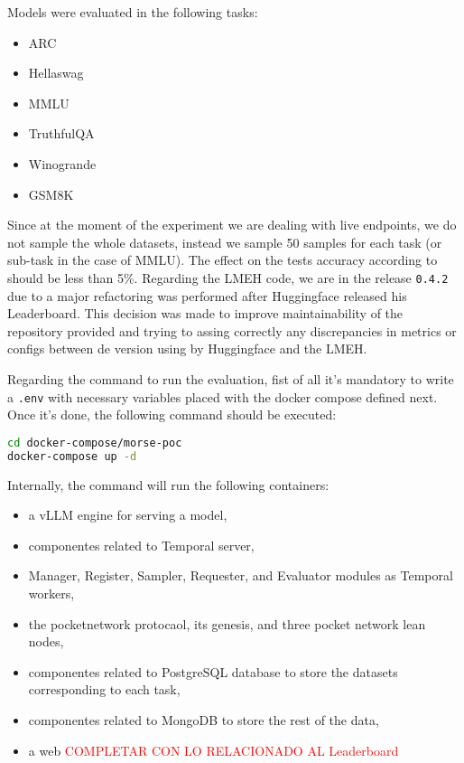 Models were evaluated in the following tasks:

\begin{itemize}[noitemsep]
    \item ARC
    \item Hellaswag
    \item MMLU
    \item TruthfulQA
    \item Winogrande
    \item GSM8K
\end{itemize}

Since at the moment of the experiment we are dealing with live endpoints, we do not sample the whole datasets, instead we sample 50 samples for each task (or sub-task in the case of MMLU). 
The effect on the tests accuracy according to \citeauthor{polo_tinybenchmarks_2024} \cite{polo_tinybenchmarks_2024} should be less than 5\%. 
Regarding the \gls{LMEH} \cite{biderman_lessons_2024} code, we are in the release \verb|0.4.2| due to a major refactoring was performed after Huggingface released his Leaderboard. 
This decision was made to improve maintainability of the repository provided and trying to assing correctly any discrepancies in metrics or configs between de version using by Huggingface and the \gls{LMEH}. 

Regarding the command to run the evaluation, fist of all it's mandatory to write a \verb|.env| with necessary variables placed with the docker compose defined next. 
Once it's done, the following command should be executed:
\begin{lstlisting}[language=bash, caption={Command to run the evaluation.}, numbers=none]
cd docker-compose/morse-poc
docker-compose up -d
\end{lstlisting}

Internally, the command will run the following containers:

\begin{itemize}[noitemsep]
    \item a vLLM \cite{kwon_efficient_2023} engine for serving a model,
    \item componentes related to Temporal server,
    \item Manager, Register, Sampler, Requester, and Evaluator modules as Temporal workers,
    \item the pocketnetwork protocaol, its genesis, and three pocket network lean nodes,
    \item componentes related to PostgreSQL database to store the datasets corresponding to each task,
    \item componentes related to MongoDB to store the rest of the data, 
    \item a web \textcolor{red}{COMPLETAR CON LO RELACIONADO AL Leaderboard} 
\end{itemize}

